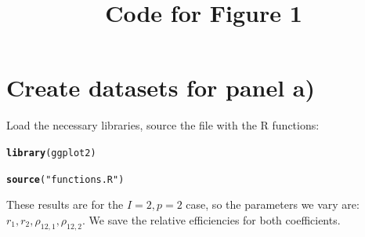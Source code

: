 \documentclass{article}\usepackage[]{graphicx}\usepackage[]{color}
\title{Code for Figure 1}
\makeatletter
\newcommand{\hlstr}[1]{\textcolor[rgb]{0.192,0.494,0.8}{#1}}%
\newcommand{\hlstd}[1]{\textcolor[rgb]{0.345,0.345,0.345}{#1}}%
\newcommand{\hlkwd}[1]{\textcolor[rgb]{0.737,0.353,0.396}{\textbf{#1}}}%
\newenvironment{kframe}{%
 \def\at@end@of@kframe{}%
 \ifinner\ifhmode%
  \def\at@end@of@kframe{\end{minipage}}%
  \begin{minipage}{\columnwidth}%
 \fi\fi%
 \def\FrameCommand##1{\hskip\@totalleftmargin \hskip-\fboxsep
 \colorbox{shadecolor}{##1}\hskip-\fboxsep
     \hskip-\linewidth \hskip-\@totalleftmargin \hskip\columnwidth}%
 \MakeFramed {\advance\hsize-\width
   \@totalleftmargin\z@ \linewidth\hsize
   \@setminipage}}%
 {\par\unskip\endMakeFramed%
 \at@end@of@kframe}
\newenvironment{knitrout}{}{} %
\makeatother
\begin{document}
\maketitle



\section{Create datasets for panel a)}

Load the necessary libraries, source the file with the R functions:
\begin{knitrout}
\color{fgcolor}\begin{kframe}
\begin{alltt}
\hlkwd{library}\hlstd{(ggplot2)}

\hlkwd{source}\hlstd{(}\hlstr{"functions.R"}\hlstd{)}
\end{alltt}
\end{kframe}
\end{knitrout}

These results are for the $I=2, p=2$ case, so the parameters we vary are:
$r_1, r_2, \rho_{12,1}, \rho_{12,2}$. We save the relative efficiencies for both coefficients.
\end{document}
